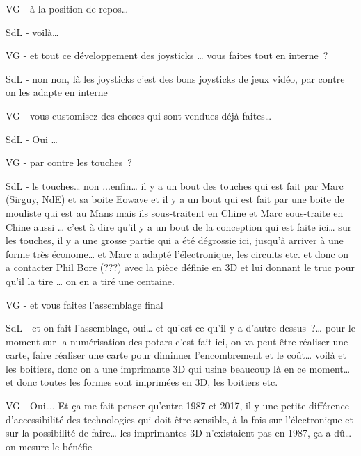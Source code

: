 VG - à la position de repos… 

SdL - voilà…  

VG - et tout ce développement des joysticks … vous faites tout en interne ?  

SdL - non non, là les joysticks c'est des bons joysticks de jeux vidéo, par contre on les adapte en interne 

VG - vous customisez des choses qui sont vendues déjà faites…  

SdL - Oui … 

VG - par contre les touches ? 

SdL - ls touches… non ...enfin… il y a un bout des touches qui est fait par Marc (Sirguy, NdE) et sa boite Eowave et il y a un bout qui est fait par une boite de mouliste qui est au Mans mais ils sous-traitent en Chine et Marc sous-traite en Chine aussi … c'est à dire qu'il y a un bout de la conception qui est faite ici… sur les touches, il y a une grosse partie qui a été dégrossie ici, jusqu'à arriver à une forme très économe… et Marc a adapté l'électronique, les circuits etc. et donc on a contacter Phil Bore (???) avec la pièce définie en 3D et lui donnant le truc pour qu'il la tire … on en a tiré une centaine. 

VG - et vous faites l'assemblage final 

SdL - et on fait l'assemblage, oui… et qu'est ce qu'il y a d'autre dessus ?… pour le moment sur la numérisation des potars c'est fait ici, on va peut-être réaliser une carte, faire réaliser une carte pour diminuer l'encombrement et le coût… voilà et les boitiers, donc on a une imprimante 3D qui usine beaucoup là en ce moment… et donc toutes les formes sont imprimées en 3D, les boitiers etc. 

VG - Oui…. Et ça me fait penser qu'entre 1987 et 2017, il y une petite différence d'accessibilité des technologies qui doit être sensible, à la fois sur l'électronique et sur la possibilité de faire… les imprimantes 3D n'existaient pas en 1987, ça a dû… on mesure le bénéfie 

